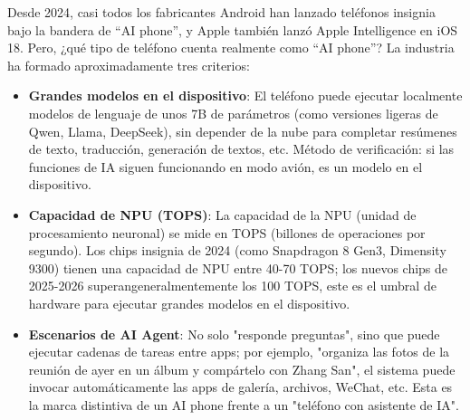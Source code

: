 


Desde 2024, casi todos los fabricantes Android han lanzado teléfonos insignia bajo la bandera de “AI phone”, y Apple también lanzó Apple Intelligence en iOS 18. Pero, ¿qué tipo de teléfono cuenta realmente como “AI phone”? La industria ha formado aproximadamente tres criterios:

\begin{itemize}
  \item \textbf{Grandes modelos en el dispositivo}: El teléfono puede ejecutar localmente modelos de lenguaje de unos 7B de parámetros (como versiones ligeras de Qwen, Llama, DeepSeek), sin depender de la nube para completar resúmenes de texto, traducción, generación de textos, etc. Método de verificación: si las funciones de IA siguen funcionando en modo avión, es un modelo en el dispositivo.
  \item \textbf{Capacidad de NPU (TOPS)}: La capacidad de la NPU (unidad de procesamiento neuronal) se mide en TOPS (billones de operaciones por segundo). Los chips insignia de 2024 (como Snapdragon 8 Gen3, Dimensity 9300) tienen una capacidad de NPU entre 40-70 TOPS; los nuevos chips de 2025-2026 superangeneralmentemente los 100 TOPS, este es el umbral de hardware para ejecutar grandes modelos en el dispositivo.
  \item \textbf{Escenarios de AI Agent}: No solo "responde preguntas", sino que puede ejecutar cadenas de tareas entre apps; por ejemplo, "organiza las fotos de la reunión de ayer en un álbum y compártelo con Zhang San", el sistema puede invocar automáticamente las apps de galería, archivos, WeChat, etc. Esta es la marca distintiva de un AI phone frente a un "teléfono con asistente de IA".
\end{itemize}

